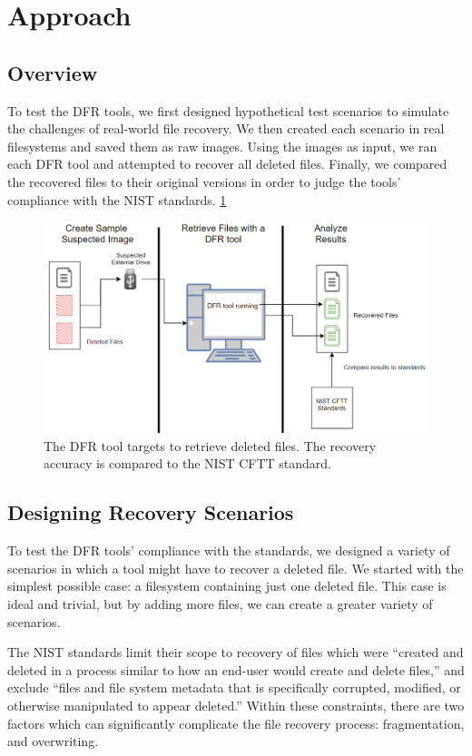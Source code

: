\section{Approach}

\subsection{Overview}

To test the DFR tools, we first designed hypothetical test scenarios to simulate the challenges of real-world file recovery.
We then created each scenario in real filesystems and saved them as raw images. 
Using the images as input, we ran each DFR tool and attempted to recover all deleted files. 
Finally, we compared the recovered files to their original versions in order to judge the tools' compliance with the NIST standards.  \ref{fig:overview}

\begin{figure}[h]
    \centering
    \includegraphics[width=\linewidth]{fig/overview.png}
    \caption{The DFR tool targets to retrieve deleted files. The recovery accuracy is compared to the NIST CFTT standard.}
    \label{fig:overview}
\end{figure}

\subsection{Designing Recovery Scenarios}
To test the DFR tools' compliance with the standards, we designed a variety of scenarios in which a tool might have to recover a deleted file. 
We started with the simplest possible case: a filesystem containing just one deleted file. 
This case is ideal and trivial, but by adding more files, we can create a greater variety of scenarios.

The NIST standards limit their scope to recovery of files which were ``created and deleted in a process similar to how an end-user would create and delete files,''\cite{meta:dfr:standards} and exclude ``files and file system metadata that is specifically corrupted, modified, or otherwise manipulated to appear deleted.''\cite{meta:dfr:standards}
Within these constraints, there are two factors which can significantly complicate the file recovery process: fragmentation, and overwriting. 

